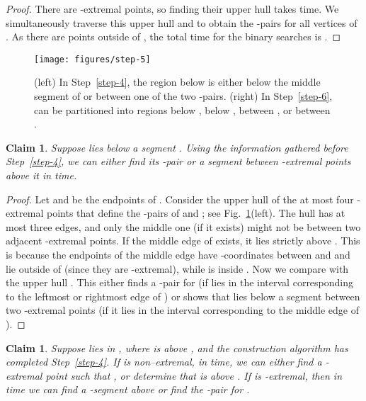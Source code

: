 \documentclass[letterpaper,11pt]{article}
\newtheorem{claim}[theorem]{Claim}
\begin{document}
\begin{proof} 
There are  -extremal 
points, so finding their upper hull takes  time. 
We simultaneously traverse this upper hull and  
to obtain the -pairs
for all vertices of . As there are
 points outside of , the
total time for the binary searches is .
\end{proof}

\begin{figure}
  \centering
  \texttt{[image: figures/step-5]}
  \caption{(left) In Step~\ref{step-4}, the 
    region below  is 
  either below the middle segment of 
  or between one of the two -pairs. 
  (right) In Step~\ref{step-6}, 
  can be partitioned into regions below 
  , below , 
  between , or between .}
  \label{fig:step-5}
\end{figure}


\begin{claim} \label{clm:step-4} 
  Suppose  lies below a segment .
  Using the information gathered before Step~\ref{step-4},
  we can either find its -pair or a segment between 
  -extremal points above it in  time.
\end{claim}

\begin{proof} 
Let  and  be the endpoints of 
. Consider the 
upper hull  of the at most four
-extremal points  that define 
the -pairs of  and 
; see Fig.~\ref{fig:step-5}(left). 
The hull  has at most three edges, 
and only the middle one (if it 
exists) might not be between two 
adjacent -extremal points. 
If the middle edge of  exists, it lies 
strictly above . This is because 
the endpoints of the middle edge have -coordinates 
between  and  and lie outside of 
 (since they are -extremal), 
while  is inside .
Now we compare  with the upper hull . This 
either finds a -pair
for  (if  lies in the interval 
corresponding to the leftmost or rightmost 
edge of ) or shows that  lies below a segment between
two -extremal points (if it lies in the
interval corresponding to the middle edge of ).
\end{proof}

\begin{claim} \label{clm:step-56} 
  Suppose  lies in , 
  where  is above , and the 
  construction algorithm has completed 
  Step~\ref{step-4}.  If  is 
  non--extremal, in  time, 
  we can either find a -extremal point 
   such that , or determine
  that  is above . 
  If  is -extremal, then in  time
  we can find a -segment above  or find the 
  -pair for .
\end{claim}
\end{document}
